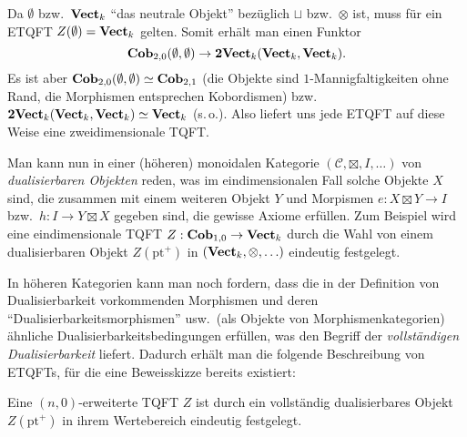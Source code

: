 Da $\emptyset$ bzw.\ $\mathbf{Vect}_k$ "`das neutrale Objekt"' bez\"uglich
$\sqcup$ bzw.\ $\otimes$ ist, muss f\"ur ein ETQFT $Z(\emptyset) =
\mathbf{Vect}_k$ gelten. Somit erh\"alt man einen Funktor
\begin{equation}
\mathbf{Cob}_{2, 0} (\emptyset, \emptyset) \to \mathbf{2Vect}_k
(\mathbf{Vect}_k, \mathbf{Vect}_k). \nonumber
\end{equation}
Es ist aber $\mathbf{Cob}_{2, 0} (\emptyset, \emptyset) \simeq
\mathbf{Cob}_{2, 1}$ (die Objekte sind $1$-Mannigfaltigkeiten ohne Rand,
die Morphismen entsprechen Kobordismen) bzw.\ $\mathbf{2Vect}_k
(\mathbf{Vect}_k, \mathbf{Vect}_k) \simeq \mathbf{Vect}_k$  (s.\,o.).
Also liefert uns jede ETQFT auf diese Weise eine zweidimensionale TQFT.

Man kann nun in einer (h\"oheren) monoidalen Kategorie $(\mathcal{C},
\boxtimes, I, \ldots)$ von \emph{dualisierbaren Objekten} reden, was im
eindimensionalen Fall solche Objekte $X$ sind, die zusammen mit einem weiteren
Objekt $Y$ und Morpismen $e: X \boxtimes Y \to I$ bzw.\ $h: I \to Y \boxtimes
X$ gegeben sind, die gewisse Axiome erf\"ullen. Zum Beispiel wird eine
eindimensionale TQFT $Z: \mathbf{Cob}_{1, 0} \to \mathbf{Vect}_k$ durch die
Wahl von einem dualisierbaren Objekt $Z(\mathrm{pt}^+)$ in $(\mathbf{Vect}_k,
\otimes, \ldots)$ eindeutig festgelegt.

In h\"oheren Kategorien kann man noch fordern, dass die in der Definition von
Dualisierbarkeit vorkommenden Morphismen und deren
"`Dualisierbarkeitsmorphismen"' usw.\  (als Objekte von Morphismenkategorien)
\"ahnliche Dualisierbarkeitsbedingungen erf\"ullen, was den Begriff der
\emph{vollst\"andigen Dualisierbarkeit} liefert. Dadurch erh\"alt man die
folgende Beschreibung von ETQFTs, f\"ur die eine Beweisskizze bereits
existiert:

\begin{Sat}[Kobordismushypothese]
Eine $(n, 0)$-erweiterte TQFT $Z$ ist durch ein vollst\"andig dualisierbares
Objekt $Z(\mathrm{pt}^+)$ in ihrem Wertebereich eindeutig festgelegt.
\end{Sat}
